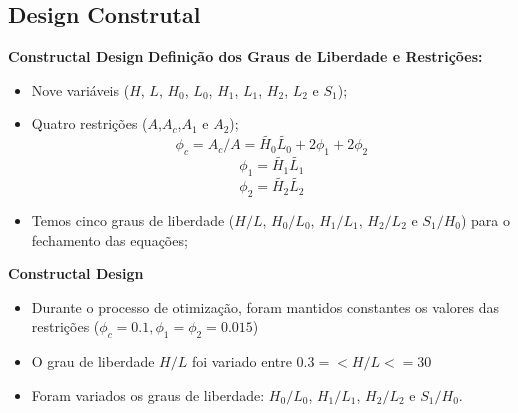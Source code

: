 \documentclass[xcolor=dvipsnames,10pt]{beamer}
\begin{document}
\subsection{Design Construtal}
\begin{frame}{}
	\begin{block}{\textbf{Constructal Design}}
		\justifying
		\setlength{\parindent}{1cm}
		\textbf{Definição dos Graus de Liberdade e Restrições:}
		\begin{itemize}
			\item Nove variáveis ($H$, $L$, $H_{0}$, $L_{0}$, $H_{1}$, $L_{1}$, $H_{2}$, $L_{2}$ e $S_{1}$);
			\item Quatro restrições ($A$,$A_c$,$A_1$ e $A_2$);
			\begin{equation}
				\phi_c = A_c/A= \tilde{H_{0}}\tilde{L_{0}}+2\phi_1+2\phi_2
			\end{equation}
			\begin{equation}
				\phi_1 = \tilde{H_{1}}\tilde{L_{1}} 
			\end{equation}
			\begin{equation}
				\phi_2 = \tilde{H_{2}}\tilde{L_{2}}
			\end{equation}
			\item Temos cinco graus de liberdade ($H/L$, $H_{0}/L_{0}$, $H_{1}/L_{1}$, $H_{2}/L_{2}$ e $S_{1}/H_{0}$) para o fechamento das equações;
			
		\end{itemize}
	\end{block}
\end{frame}
\begin{frame}{}
	\begin{block}{\textbf{Constructal Design}}
		\justifying
		\setlength{\parindent}{1cm}
		\begin{itemize}
\item Durante o processo de otimização, foram mantidos constantes os valores das restrições ($\phi_c = 0.1,  \phi_1 = \phi_2 = 0.015$) 
\item O grau de liberdade $H/L$ foi variado entre $0.3 =< H/L<= 30$
			\item Foram variados os graus de liberdade: $H_{0}/L_{0}$, $H_{1}/L_{1}$, $H_{2}/L_{2}$ e $S_{1}/H_{0}$.

		\end{itemize}
	\end{block}
\end{frame}
\end{document}
